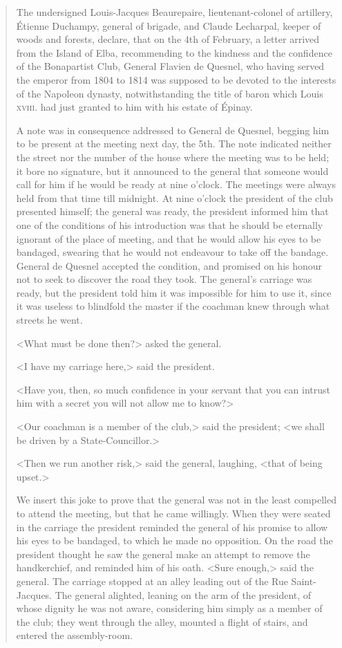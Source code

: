\begin{quotation}
The undersigned Louis-Jacques Beaurepaire, lieutenant-colonel of artillery, Étienne Duchampy, general of brigade, and Claude Lecharpal, keeper of woods and forests, declare, that on the 4th of February, a letter arrived from the Island of Elba, recommending to the kindness and the confidence of the Bonapartist Club, General Flavien de Quesnel, who having served the emperor from 1804 to 1814 was supposed to be devoted to the interests of the Napoleon dynasty, notwithstanding the title of baron which Louis \textsc{xviii.} had just granted to him with his estate of Épinay.  

A note was in consequence addressed to General de Quesnel, begging him to be present at the meeting next day, the 5th. The note indicated neither the street nor the number of the house where the meeting was to be held; it bore no signature, but it announced to the general that someone would call for him if he would be ready at nine o'clock. The meetings were always held from that time till midnight. At nine o'clock the president of the club presented himself; the general was ready, the president informed him that one of the conditions of his introduction was that he should be eternally ignorant of the place of meeting, and that he would allow his eyes to be bandaged, swearing that he would not endeavour to take off the bandage. General de Quesnel accepted the condition, and promised on his honour not to seek to discover the road they took. The general's carriage was ready, but the president told him it was impossible for him to use it, since it was useless to blindfold the master if the coachman knew through what streets he went. 

<What must be done then?> asked the general.

<I have my carriage here,> said the president. 

<Have you, then, so much confidence in your servant that you can intrust him with a secret you will not allow me to know?> 

<Our coachman is a member of the club,> said the president; <we shall be driven by a State-Councillor.> 

<Then we run another risk,> said the general, laughing, <that of being upset.>

We insert this joke to prove that the general was not in the least compelled to attend the meeting, but that he came willingly. When they were seated in the carriage the president reminded the general of his promise to allow his eyes to be bandaged, to which he made no opposition. On the road the president thought he saw the general make an attempt to remove the handkerchief, and reminded him of his oath. <Sure enough,> said the general. The carriage stopped at an alley leading out of the Rue Saint-Jacques. The general alighted, leaning on the arm of the president, of whose dignity he was not aware, considering him simply as a member of the club; they went through the alley, mounted a flight of stairs, and entered the assembly-room. 


\end{quotation}
